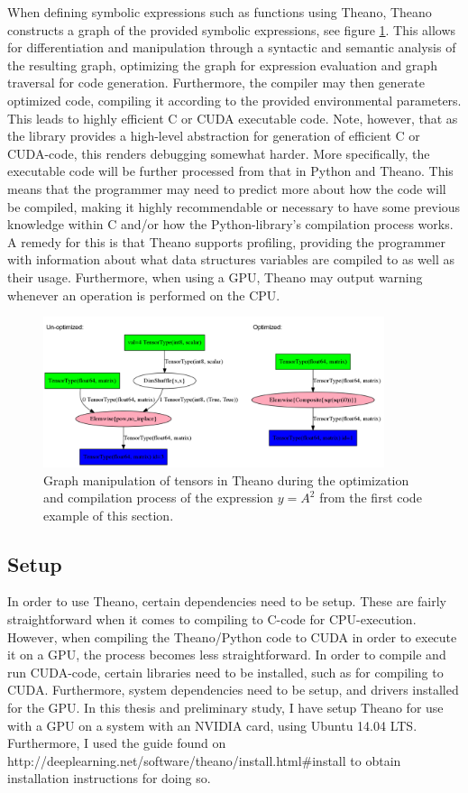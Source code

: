 When defining symbolic expressions such as functions using Theano, Theano constructs a graph of the provided symbolic expressions, see figure \ref{fig:theano_graph_demo}. This allows for differentiation and manipulation through a syntactic and semantic analysis of the resulting graph, optimizing the graph for expression evaluation and graph traversal for code generation. Furthermore, the compiler may then generate optimized code, compiling it according to the provided environmental parameters. This leads to highly efficient C or CUDA executable code.
Note, however, that as the library provides a high-level abstraction for generation of efficient C or CUDA-code, this renders debugging somewhat harder. More specifically, the executable code will be further processed from that in Python and Theano. This means that the programmer may need to predict more about how the code will be compiled, making it highly recommendable or necessary to have some previous knowledge within C and/or how the Python-library's compilation process works. A remedy for this is that Theano supports profiling, providing the programmer with information about what data structures variables are compiled to as well as their usage. Furthermore, when using a GPU, Theano may output warning whenever an operation is performed on the CPU.

\begin{figure}
\centering
\includegraphics[width=10cm]{fig/unopt_opt_theano_graph}
\caption{Graph manipulation of tensors in Theano during the optimization and compilation process of the expression $y = A^2$ from the first code example of this section.}
\label{fig:theano_graph_demo}
\end{figure}

\subsection{Setup}

In order to use Theano, certain dependencies need to be setup. These are fairly straightforward when it comes to compiling to C-code for CPU-execution. However, when compiling the Theano/Python code to CUDA in order to execute it on a GPU, the process becomes less straightforward. In order to compile and run CUDA-code, certain libraries need to be installed, such as for compiling to CUDA. Furthermore, system dependencies need to be setup, and drivers installed for the GPU. In this thesis and preliminary study, I have setup Theano for use with a GPU on a system with an NVIDIA card, using Ubuntu 14.04 LTS. Furthermore, I used the guide found on \\http://deeplearning.net/software/theano/install.html\#install to obtain installation instructions for doing so.


